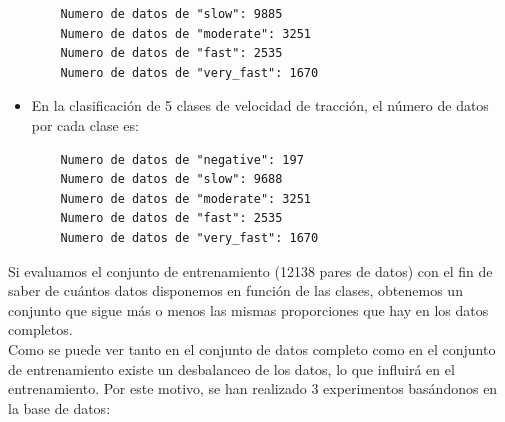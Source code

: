 \begin{itemize}
    \vspace{10pt}
    \begin{lstlisting}
    Numero de datos de "slow": 9885
    Numero de datos de "moderate": 3251
    Numero de datos de "fast": 2535
    Numero de datos de "very_fast": 1670
    \end{lstlisting}
    \vspace{20pt}

    \item En la clasificación de 5 clases de velocidad de tracción,  el número de datos por cada clase es:

    \vspace{10pt}
    \begin{lstlisting}
    Numero de datos de "negative": 197
    Numero de datos de "slow": 9688
    Numero de datos de "moderate": 3251
    Numero de datos de "fast": 2535
    Numero de datos de "very_fast": 1670
    \end{lstlisting}
    \vspace{20pt}

\end{itemize}


Si evaluamos el conjunto de entrenamiento (12138 pares de datos) con el fin de saber de cuántos datos disponemos en función de las clases, obtenemos un conjunto que sigue más o menos las mismas proporciones que hay en los datos completos.\\


Como se puede ver tanto en el conjunto de datos completo como en el conjunto de entrenamiento existe un desbalanceo de los datos, lo que influirá en el entrenamiento. Por este motivo, se han realizado 3 experimentos basándonos en la base de datos:\\

